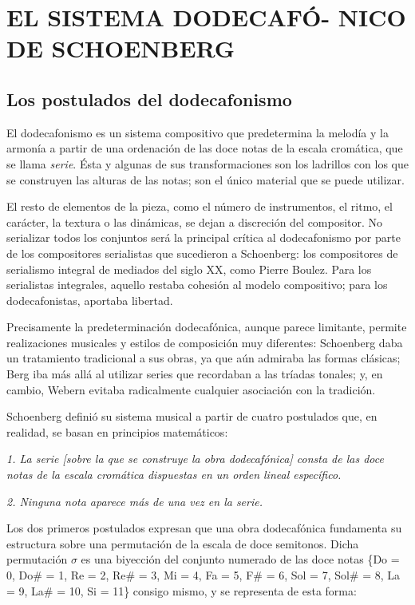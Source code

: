 \chapter[EL SISTEMA DODECAFÓNICO DE SCHOENBERG]{EL SISTEMA DODECAFÓ- NICO DE SCHOENBERG}
	\section{Los postulados del dodecafonismo}
		El dodecafonismo es un sistema compositivo que predetermina la melodía y la armonía a partir de una ordenación de las doce notas de la escala cromática, que se llama \textit{serie}. Ésta y algunas de sus transformaciones son los ladrillos con los que se construyen las alturas de las notas; son el único material que se puede utilizar.
		
		El resto de elementos de la pieza, como el número de instrumentos, el ritmo, el carácter, la textura o las dinámicas, se dejan a discreción del compositor. No serializar todos los conjuntos será la principal crítica al dodecafonismo por parte de los compositores serialistas que sucedieron a Schoenberg: los compositores de serialismo integral de mediados del siglo XX, como Pierre Boulez. Para los serialistas integrales, aquello restaba cohesión al modelo compositivo; para los dodecafonistas, aportaba libertad.
		
		Precisamente la predeterminación dodecafónica, aunque parece limitante, permite realizaciones musicales y estilos de composición muy diferentes: Schoenberg daba un tratamiento tradicional a sus obras, ya que aún admiraba las formas clásicas; Berg iba más allá al utilizar series que recordaban a las tríadas tonales; y, en cambio, Webern evitaba radicalmente cualquier asociación con la tradición.
		
		Schoenberg definió su sistema musical a partir de cuatro postulados que, en realidad, se basan en principios matemáticos:
		
		{\it1. La serie \emph{[sobre la que se construye la obra dodecafónica]} consta de las doce notas de la escala cromática dispuestas en un orden lineal específico.}
		
		{\it2. Ninguna nota aparece más de una vez en la serie.}
		
		Los dos primeros postulados expresan que una obra dodecafónica fundamenta su estructura sobre una permutación de la escala de doce semitonos. Dicha permutación $\sigma$ es una biyección del conjunto numerado de las doce notas \{Do = 0, Do\# = 1, Re = 2, Re\# = 3, Mi = 4, Fa = 5, F\# = 6, Sol = 7, Sol\# = 8, La = 9, La\# = 10, Si = 11\} consigo mismo, y se representa de esta forma:
		
